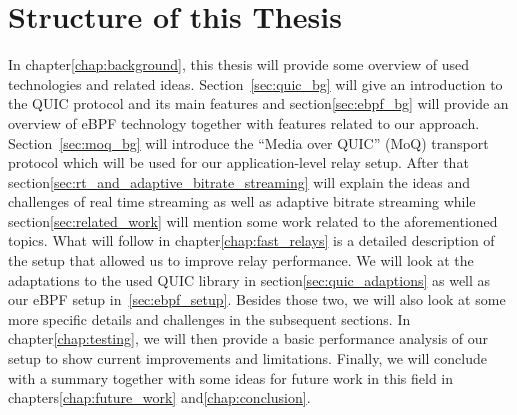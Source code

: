 \section{Structure of this Thesis}\label{sec:structure_of_thesis}

In chapter\nobreakspace\ref{chap:background}, this thesis will provide some overview of used technologies
and related ideas.
Section~\ref{sec:quic_bg} will give an introduction to the QUIC protocol and its main features and 
section\nobreakspace\ref{sec:ebpf_bg} will provide an overview of eBPF technology together with features related to 
our approach.
Section~\ref{sec:moq_bg} will introduce the ``Media over QUIC'' (MoQ) transport protocol which will be used 
for our application-level relay setup.
After that section\nobreakspace\ref{sec:rt_and_adaptive_bitrate_streaming} will explain the ideas and challenges of 
real time streaming as well as adaptive bitrate streaming while section\nobreakspace\ref{sec:related_work} will 
mention some work related to the aforementioned topics.
What will follow in chapter\nobreakspace\ref{chap:fast_relays} is a detailed description of the setup that 
allowed us to improve relay performance. 
We will look at the adaptations to the used QUIC library in section\nobreakspace\ref{sec:quic_adaptions} as well as 
our eBPF setup in~\ref{sec:ebpf_setup}. Besides those two, we will also look at some more specific details and 
challenges in the subsequent sections.
In chapter\nobreakspace\ref{chap:testing}, we will then provide a basic performance analysis of our setup to show current improvements and limitations.
Finally, we will conclude with a summary together with some ideas for future work in this field in chapters\nobreakspace\ref{chap:future_work} 
and\nobreakspace\ref{chap:conclusion}.
